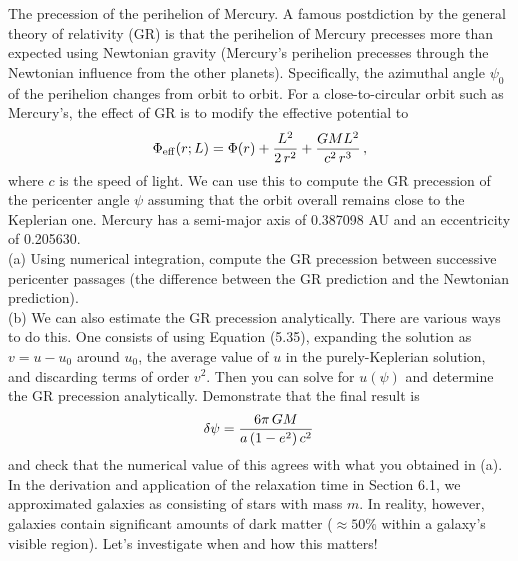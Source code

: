 \documentclass[12pt]{article}
\begin{document}
 The precession of the perihelion of Mercury. A famous 
postdiction by the general theory of relativity (GR) is that the perihelion of 
Mercury precesses more than expected using Newtonian gravity (Mercury's perihelion 
precesses through the Newtonian influence from the other planets). Specifically, 
the azimuthal angle \(\psi_0\) of the perihelion changes from orbit to orbit. 
For a close-to-circular orbit such as Mercury's, the effect of GR is to modify the 
effective potential to
\begin{equation*}
\begin{split}\Phi_\mathrm{eff}(r;L) = \Phi(r) + \frac{L^2}{2\,r^2} + {GM L^2 \over c^2\,r^3}\,,\end{split}
\end{equation*}
where \(c\) is the speed of light. We can use this to compute the GR precession of the 
pericenter angle \(\psi\) assuming that the orbit overall remains close to the 
Keplerian one. Mercury has a semi-major axis of 0.387098 AU and an 
eccentricity of 0.205630.\\

(a) Using numerical integration, compute the GR precession between successive pericenter 
passages (the difference between the GR prediction and the Newtonian prediction).\\

(b) We can also estimate the GR precession analytically. There are various ways to do 
this. One consists of using Equation (5.35), expanding the solution as \(v = u-u_0\) 
around \(u_0\), the average value of \(u\) in the purely-Keplerian solution, and 
discarding terms of order \(v^2\). Then you can solve for \(u(\psi)\) and determine 
the GR precession analytically. Demonstrate that the final result is
\begin{equation*}
\begin{split}\delta \psi = {6\pi\,GM \over a\,(1-e^2)\,c^2}\,\end{split}
\end{equation*}
and check that the numerical value of this agrees with what you obtained in (a).\\

 In the derivation and application of the relaxation time in 
Section 6.1, we approximated galaxies as consisting of stars with mass \(m\). In 
reality, however, galaxies contain significant amounts of dark matter 
(\(\approx 50\%\) within a galaxy's visible region). Let's investigate when and how 
this matters!\\
\end{document}
